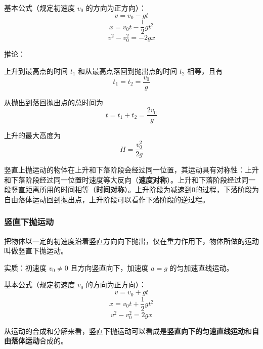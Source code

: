 基本公式（规定初速度 $v_0$ 的方向为正方向）：
\begin{equation}
v=v_0-gt
\end{equation}
\begin{equation}
x=v_0t-\frac12gt^2
\end{equation}
\begin{equation}
v^2-v_0^2=-2gx
\end{equation}

推论：

上升到最高点的时间 $t_1$ 和从最高点落回到抛出点的时间 $t_2$ 相等，且有
\begin{equation}
t_1=t_2=\frac{v_0}{g}
\end{equation}

从抛出到落回抛出点的总时间为
\begin{equation}
t=t_1+t_2=\frac{2v_0}{g}
\end{equation}

上升的最大高度为
\begin{equation}
H=\frac{v_0^2}{2g}
\end{equation}

竖直上抛运动的物体在上升和下落阶段会经过同一位置，其运动具有对称性：上升和下落阶段经过同一位置时速度等大反向（\textbf{速度对称}）。上升和下落阶段经过同一段竖直距离所用的时间相等（\textbf{时间对称}）。上升阶段为减速到0的过程，下落阶段为自由落体运动回到抛出点，上升阶段可以看作下落阶段的逆过程。

\subsubsection{竖直下抛运动}
把物体以一定的初速度沿着竖直方向向下抛出，仅在重力作用下，物体所做的运动叫做竖直下抛运动。

实质：初速度 $v_0\neq0$ 且方向竖直向下，加速度 $a=g$ 的匀加速直线运动。

基本公式（规定初速度 $v_0$ 的方向为正方向）：
\begin{equation}
v=v_0+gt
\end{equation}
\begin{equation}
x=v_0t+\frac12gt^2
\end{equation}
\begin{equation}
v^2-v_0^2=2gx
\end{equation}

从运动的合成和分解来看，竖直下抛运动可以看成是\textbf{竖直向下的匀速直线运动}和\textbf{自由落体运动}合成的。